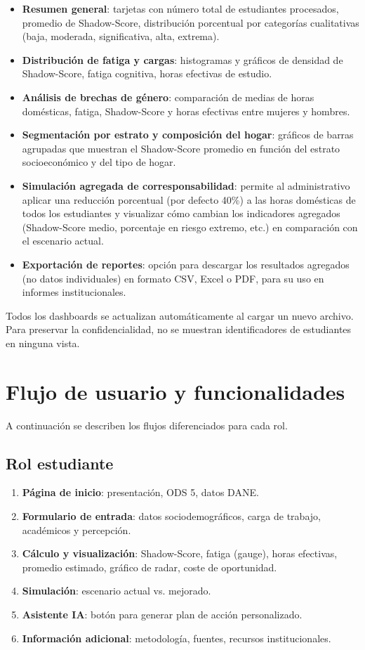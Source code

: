 \documentclass[12pt, spanish]{article}
\begin{document}
\begin{itemize}
    \item \textbf{Resumen general}: tarjetas con número total de estudiantes procesados, promedio de Shadow-Score, distribución porcentual por categorías cualitativas (baja, moderada, significativa, alta, extrema).
    \item \textbf{Distribución de fatiga y cargas}: histogramas y gráficos de densidad de Shadow-Score, fatiga cognitiva, horas efectivas de estudio.
    \item \textbf{Análisis de brechas de género}: comparación de medias de horas domésticas, fatiga, Shadow-Score y horas efectivas entre mujeres y hombres.
    \item \textbf{Segmentación por estrato y composición del hogar}: gráficos de barras agrupadas que muestran el Shadow-Score promedio en función del estrato socioeconómico y del tipo de hogar.
    \item \textbf{Simulación agregada de corresponsabilidad}: permite al administrativo aplicar una reducción porcentual (por defecto 40\%) a las horas domésticas de todos los estudiantes y visualizar cómo cambian los indicadores agregados (Shadow-Score medio, porcentaje en riesgo extremo, etc.) en comparación con el escenario actual.
    \item \textbf{Exportación de reportes}: opción para descargar los resultados agregados (no datos individuales) en formato CSV, Excel o PDF, para su uso en informes institucionales.
\end{itemize}

Todos los dashboards se actualizan automáticamente al cargar un nuevo archivo. Para preservar la confidencialidad, no se muestran identificadores de estudiantes en ninguna vista.

\section{Flujo de usuario y funcionalidades}

A continuación se describen los flujos diferenciados para cada rol.

\subsection{Rol estudiante}
\begin{enumerate}
    \item \textbf{Página de inicio}: presentación, ODS 5, datos DANE.
    \item \textbf{Formulario de entrada}: datos sociodemográficos, carga de trabajo, académicos y percepción.
    \item \textbf{Cálculo y visualización}: Shadow-Score, fatiga (gauge), horas efectivas, promedio estimado, gráfico de radar, coste de oportunidad.
    \item \textbf{Simulación}: escenario actual vs. mejorado.
    \item \textbf{Asistente IA}: botón para generar plan de acción personalizado.
    \item \textbf{Información adicional}: metodología, fuentes, recursos institucionales.
\end{enumerate}
\end{document}
